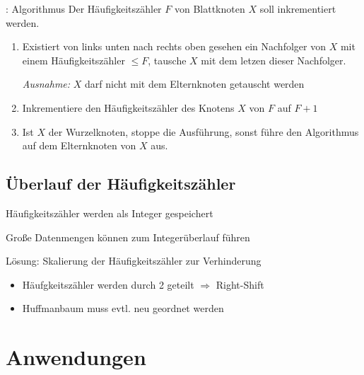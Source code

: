 \documentclass[xcolor=dvipsnames,presentation]{beamer}    %
\newenvironment{witemize}{\itemize\setlength{\itemsep}{1em}}{\enditemize}
\begin{document}
\begin{frame}[<+->]{\insertsubsection: Algorithmus}
  Der Häufigkeitszähler $F$ von Blattknoten $X$ soll inkrementiert werden.

  \vspace{1cm}

  \begin{enumerate}
  \item Existiert von links unten nach rechts oben gesehen ein
    Nachfolger von $X$ mit einem Häufigkeitszähler $\leq F$, tausche
    $X$ mit dem letzen dieser Nachfolger.

    \emph{Ausnahme:} $X$ darf nicht mit dem Elternknoten getauscht werden
  \item Inkrementiere den Häufigkeitszähler des Knotens $X$ von $F$ auf $F+1$

  \item Ist $X$ der Wurzelknoten, stoppe die Ausführung, sonst führe
    den Algorithmus auf dem Elternknoten von $X$ aus.
  \end{enumerate}
\end{frame}

\subsection{Überlauf der Häufigkeitszähler}

\begin{frame}[<+->]{\insertsubsection}
  \begin{witemize}
  \item Häufigkeitszähler werden als Integer gespeichert
  \item Große Datenmengen können zum Integerüberlauf führen
  \item Lösung: Skalierung der Häufigkeitszähler zur Verhinderung
    \begin{itemize}
    \item Häufgkeitszähler werden durch 2 geteilt $\Rightarrow$ Right-Shift
    \item Huffmanbaum muss evtl. neu geordnet werden
    \end{itemize}
  \end{witemize}
\end{frame}

\section{Anwendungen}
\end{document}

